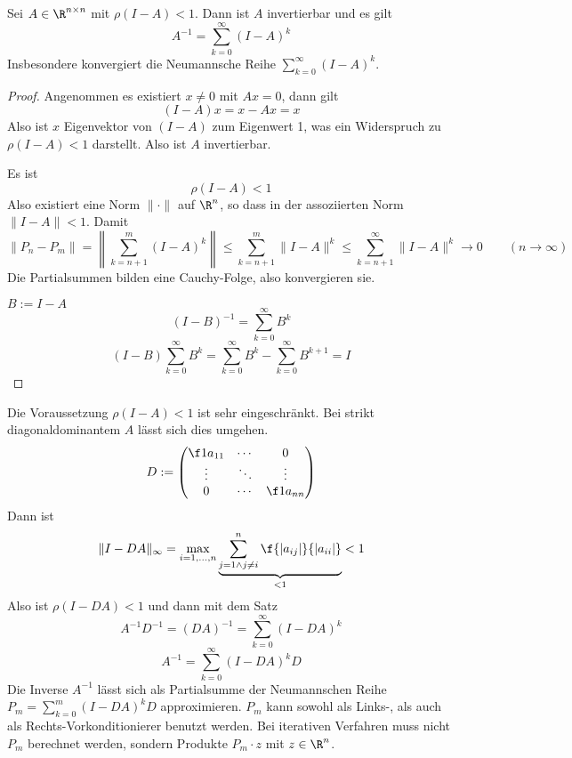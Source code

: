 \documentclass{mycourse}
\begin{document}
\begin{st}
	\label{st:6.4}
	Sei $A\in \R^{n\times n}$ mit $\rho(I-A)<1$.
	Dann ist $A$ invertierbar und es gilt
	\[
		A^{-1} = \sum_{k=0}^\infty (I-A)^k
	\]
	Insbesondere konvergiert die Neumannsche Reihe $\sum_{k=0}^\infty (I-A)^k$.
	\begin{proof}
		Angenommen es existiert $x\neq 0$ mit $Ax=0$, dann gilt
		\[
			(I-A)x = x-Ax = x
		\]
		Also ist $x$ Eigenvektor von $(I-A)$ zum Eigenwert 1, was ein Widerspruch zu $\rho(I-A)<1$ darstellt.
		Also ist $A$ invertierbar.

		Es ist
		\[
			\rho(I-A) < 1
		\]
		Also existiert eine Norm $\|\cdot\|$ auf $\R^n$, so dass in der assoziierten Norm $\|I-A\| < 1$.
		Damit
		\[
			\|P_n - P_m\| = \left\|\sum_{k=n+1}^m(I-A)^k\right\| \le  \sum_{k=n+1}^m\|I-A\|^k \le \sum_{k=n+1}^\infty \|I-A\|^k \to 0 \qquad (n\to \infty)
		\]
		Die Partialsummen bilden eine Cauchy-Folge, also konvergieren sie.

		$B:= I-A$
		\[
			(I-B)^{-1} = \sum_{k=0}^\infty B^k
		\]
		\[
			(I-B)\sum_{k=0}^\infty B^k = \sum_{k=0}^\infty B^k - \sum_{k=0}^\infty B^{k+1} = I
		\]
	\end{proof}
	\begin{note}
		Die Voraussetzung $\rho(I-A)<1$ ist sehr eingeschränkt.
		Bei strikt diagonaldominantem $A$ lässt sich dies umgehen.
		\[
			D := \begin{pmatrix}\f 1{a_{11}} & \cdots & 0 \\ \vdots & \ddots & \vdots \\ 0 & \cdots & \f 1{a_{nn}}\end{pmatrix}
		\]
		Dann ist
		\[
			\|I - DA\|_\infty = \max_{i=1,\dotsc, n} \underbrace{\sum_{j=1\land j\neq i}^n \f{|a_{ij}|}{|a_{ii}|}}_{<1} < 1
		\]
		Also ist $\rho(I-DA) < 1$ und dann mit dem Satz
		\[
			A^{-1}D^{-1} = (DA)^{-1} = \sum_{k=0}^\infty (I-DA)^k
		\]
		\[
			A^{-1} = \sum_{k=0}^\infty (I-DA)^k D
		\]
		Die Inverse $A^{-1}$ lässt sich als Partialsumme der Neumannschen Reihe $P_m = \sum_{k=0}^m(I-DA)^kD$ approximieren.
		$P_m$ kann sowohl als Links-, als auch als Rechts-Vorkonditionierer benutzt werden.
		Bei iterativen Verfahren muss nicht $P_m$ berechnet werden, sondern Produkte $P_m\cdot z$ mit $z\in \R^n$. 
	\end{note}
\end{st}
\end{document}
